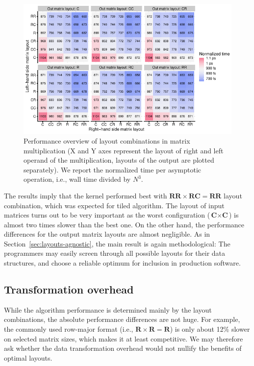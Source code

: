 \begin{figure}
	\centering
	\includegraphics{plots/heatmap_all.pdf}
	\caption{Performance overview of layout combinations in matrix multiplication (X and Y axes represent the layout of right and left operand of the multiplication, layouts of the output are plotted separately). We report the normalized time per asymptotic operation, i.e., wall time divided by $N^3$.}
	\label{fig:matmul_heatmap_all}
\end{figure}

The results imply that the kernel performed best with $\textbf{RR}\times \textbf{RC}=\textbf{RR}$ layout combination, which was expected for tiled algorithm. The layout of input matrices turns out to be very important as the worst configuration ($\textbf{C}\times \textbf{C}$) is almost two times slower than the best one. On the other hand, the performance differences for the output matrix layouts are almost negligible. As in Section~\ref{sec:layouts-agnostic}, the main result is again methodological: The programmers may easily screen through all possible layouts for their data structures, and choose a reliable optimum for inclusion in production software.

\subsection{Transformation overhead}

While the algorithm performance is determined mainly by the layout combinations, the absolute performance differences are not huge. For example, the commonly used row-major format (i.e., $\textbf{R}\times \textbf{R} = \textbf{R}$) is only about 12\% slower on selected matrix sizes, which makes it at least competitive. We may therefore ask whether the data transformation overhead would not nullify the benefits of optimal layouts.


